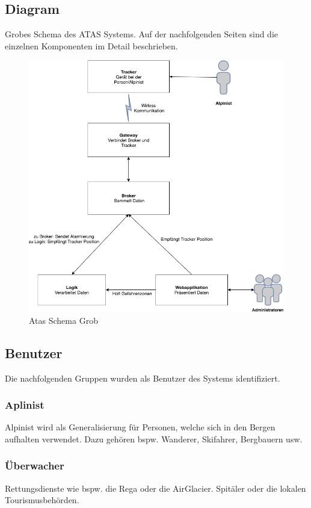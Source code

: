 \documentclass[11pt,english,german]{report}
\theoremstyle{definition}
\begin{document}
\subsection{Diagram}
Grobes Schema des ATAS Systems. Auf der nachfolgenden Seiten sind die einzelnen Komponenten im Detail beschrieben.\\[0.3cm]
\begin{figure}[H]
	\centering
	\includegraphics[width=\textwidth]{img/system/ATAS_SystemOverview_Abstract_BA.png}
	\caption[Atas Schema Grob]
	{Atas Schema Grob}
\end{figure}

\newpage
\subsection{Benutzer}
Die nachfolgenden Gruppen wurden als Benutzer des Systems identifiziert.
\subsubsection{Aplinist}
Alpinist wird als Generalisierung für Personen, welche sich in den Bergen aufhalten verwendet. Dazu gehören bspw. Wanderer, Skifahrer, Bergbauern usw.
\subsubsection{Überwacher}
Rettungsdienste wie bspw. die Rega oder die AirGlacier. Spitäler oder die lokalen Tourismusbehörden.
\end{document}
